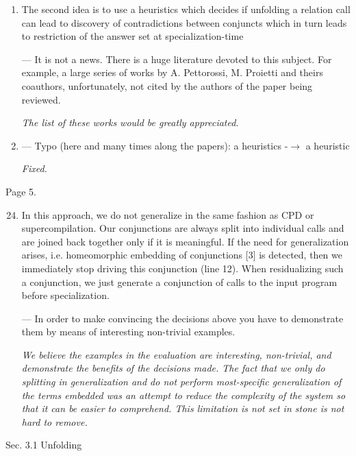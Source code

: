 \begin{enumerate}
{    %
  }

  \item{
    The second idea is to use a heuristics which decides if unfolding a relation call can lead to discovery of contradictions between conjuncts which in turn leads to restriction of the answer set at specialization-time

    --- It is not a news. There is a huge literature devoted to this subject. For example, a large series of works by A. Pettorossi, M. Proietti and theirs coauthors, unfortunately, not cited by the authors of the paper being reviewed.

    \emph{The list of these works would be greatly appreciated.}
  }

  \item{ --- Typo (here and many times along the papers): a heuristics -$\to$ a heuristic

  \emph{Fixed.}
  }

\end{enumerate}

Page 5.

\begin{enumerate}
  \setcounter{enumi}{23}
  \item {
    In this approach, we do not generalize in the same fashion as CPD or supercompilation. Our conjunctions are always split into individual calls and are joined back together only if it is meaningful. If the need for generalization arises, i.e. homeomorphic embedding of conjunctions [3] is detected, then we immediately stop driving this conjunction (line 12). When residualizing such a conjunction, we just generate a conjunction of calls to the input program before specialization.

    --- In order to make convincing the decisions above you have to demonstrate them by means of interesting non-trivial examples.

    \emph{We believe the examples in the evaluation are  interesting, non-trivial, and demonstrate the benefits of the decisions made. The fact that we only do splitting in generalization and do not perform most-specific generalization of the terms embedded was an attempt to reduce the complexity of the system so that it can be easier to comprehend. This limitation is not set in stone is not hard to remove. }

  }
\end{enumerate}

Sec. 3.1 Unfolding

